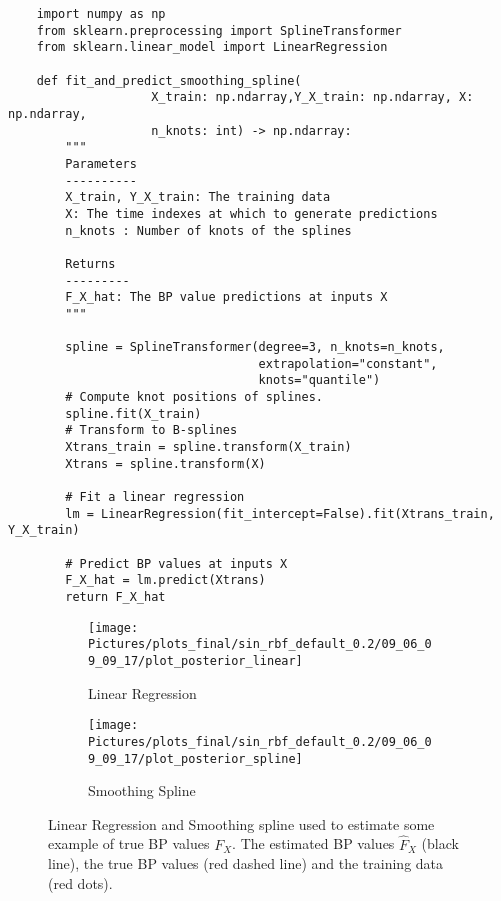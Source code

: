 %
\begin{code}
\label{code:code:smoothing-spline}
\begin{verbatim}
    import numpy as np
    from sklearn.preprocessing import SplineTransformer
    from sklearn.linear_model import LinearRegression

    def fit_and_predict_smoothing_spline(
                    X_train: np.ndarray,Y_X_train: np.ndarray, X: np.ndarray,
                    n_knots: int) -> np.ndarray:
        """
        Parameters
        ----------
        X_train, Y_X_train: The training data
        X: The time indexes at which to generate predictions
        n_knots : Number of knots of the splines

        Returns
        ---------
        F_X_hat: The BP value predictions at inputs X
        """

        spline = SplineTransformer(degree=3, n_knots=n_knots,
                                   extrapolation="constant",
                                   knots="quantile")
        # Compute knot positions of splines.
        spline.fit(X_train)
        # Transform to B-splines
        Xtrans_train = spline.transform(X_train)
        Xtrans = spline.transform(X)

        # Fit a linear regression
        lm = LinearRegression(fit_intercept=False).fit(Xtrans_train, Y_X_train)

        # Predict BP values at inputs X
        F_X_hat = lm.predict(Xtrans)
        return F_X_hat

\end{verbatim}

\end{code}


\begin{figure}[!ht]
\centering
\begin{subfigure}{.5\textwidth}
    \centering
    \texttt{[image: 
        Pictures/plots\_final/sin\_rbf\_default\_0.2/09\_06\_09\_09\_17/plot\_posterior\_linear]}
    \caption{Linear Regression}
    \label{fig:post-linear}
\end{subfigure}\hfill
\begin{subfigure}{.5\textwidth}
    \centering
    \texttt{[image: 
        Pictures/plots\_final/sin\_rbf\_default\_0.2/09\_06\_09\_09\_17/plot\_posterior\_spline]}
    \caption{Smoothing Spline}
    \label{fig:post-spline}
\end{subfigure}
\caption{Linear Regression and Smoothing spline used
to estimate some example of true BP values $F_X$. The estimated BP values $\hat{F}_X$ (black line), the
        true BP values (red dashed line) and the training data (red dots).}
\label{fig:regression-example}
\end{figure}


